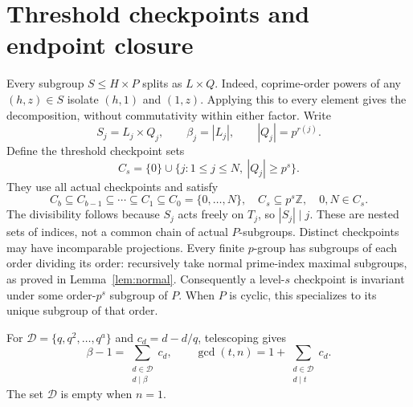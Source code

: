 \documentclass[11pt,letterpaper]{article}
\theoremstyle{definition}\newtheorem{definition}{Definition}
\newcommand{\D}{\mathcal D}
\begin{document}
\section{Threshold checkpoints and endpoint closure}\label{sec:checkpoints}
Every subgroup $S\le H\times P$ splits as $L\times Q$. Indeed, coprime-order powers of any $(h,z)\in S$ isolate $(h,1)$ and $(1,z)$. Applying this to every element gives the decomposition, without commutativity within either factor. Write
\[
S_j=L_j\times Q_j,\qquad \beta_j=|L_j|,\qquad |Q_j|=p^{r(j)}.
\]
Define the threshold checkpoint sets
\[
C_s=\{0\}\cup\{j:1\le j\le N,\ |Q_j|\ge p^s\}.
\]
They use all actual checkpoints and satisfy
\begin{equation}
C_b\subseteq C_{b-1}\subseteq\cdots\subseteq C_1\subseteq C_0=\{0,\ldots,N\},
\quad C_s\subseteq p^s\mathbb Z,\quad 0,N\in C_s.\label{eq:hierarchy}
\end{equation}
The divisibility follows because $S_j$ acts freely on $T_j$, so $|S_j|\mid j$. These are nested sets of indices, not a common chain of actual $P$-subgroups. Distinct checkpoints may have incomparable projections. Every finite $p$-group has subgroups of each order dividing its order: recursively take normal prime-index maximal subgroups, as proved in Lemma~\ref{lem:normal}. Consequently a level-$s$ checkpoint is invariant under some order-$p^s$ subgroup of $P$. When $P$ is cyclic, this specializes to its unique subgroup of that order.

For $\D=\{q,q^2,\ldots,q^a\}$ and $c_d=d-d/q$, telescoping gives
\begin{equation}
\beta-1=\sum_{\substack{d\in\D\\d\mid\beta}}c_d,
\qquad \gcd(t,n)=1+\sum_{\substack{d\in\D\\d\mid t}}c_d.\label{eq:weights}
\end{equation}
The set $\D$ is empty when $n=1$.
\end{document}
